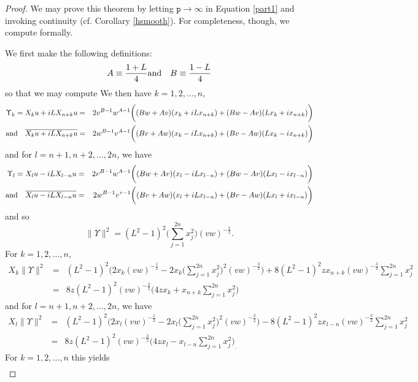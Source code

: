 \documentclass[12pt]{amsart}
\theoremstyle{plain}
\theoremstyle{definition}
\numberwithin{equation}{section}
\begin{document}
\begin{proof}
We may prove this theorem by letting ${\texttt{p}}\to\infty$ in Equation \eqref{part1} and invoking continuity (cf. Corollary \ref{hsmooth}). For completeness, though, we compute formally. 

We first make the following definitions:
\begin{eqnarray*}
A  \equiv  \frac{1+L}{4} & \textmd{and} & 
B  \equiv  \frac{1-L}{4} 
\end{eqnarray*}
so that we may compute
We then have $k=1,2,\ldots, n$, 
\begin{eqnarray*}
\Upsilon_k=X_ku+iLX_{n+k}u & = & 2v^{B-1}w^{A-1}\bigg((B w+ A v)(x_k+iLx_{n+k})+(B w- A v)(Lx_k+ix_{n+k})\bigg)\\
\textmd{and} \ \ \ \overline{X_ku+iLX_{n+k}u} & = & 2w^{B-1}v^{A-1}\bigg((B v+ A w)(x_k-iLx_{n+k}) +(B v- A w)(Lx_k-ix_{n+k})\bigg)
\end{eqnarray*}
and for $l=n+1, n+2, \ldots, 2n$, we have
\begin{eqnarray*}
\Upsilon_l=X_lu-iLX_{l-n}u & = & 2v^{B-1}w^{A-1}\bigg((B w+ A v)(x_l-iLx_{l-n})+(B w- A v)(Lx_{l}-ix_{l-n})\bigg)\\
\textmd{and} \ \ \ \overline{X_lu-iLX_{l-n}u} & = & 2w^{B-1}v^{\tau-1}\bigg((B v+ A w)(x_l+iLx_{l-n})+(B v- A w)(Lx_{l}+ix_{l-n})\bigg)
\end{eqnarray*}
and so 
\begin{equation*}
\| \Upsilon\|^{2}
= ( L^2-1)^2\Big(\sum_{j=1}^{2n}x_j^2 \Big)(vw)^{-\frac{1}{2}}.
\end{equation*}
For $k=1,2,\ldots, n$, 
\begin{eqnarray*}
X_k\| \Upsilon\|^{2}
 & = & ( L^2-1)^2\Big(2x_k (vw)^{-\frac{1}{2}}-2x_k\Big(\sum_{j=1}^{2n}x_j^2\Big)^2 (vw)^{-\frac{3}{2}} \Big)+8( L^2-1)^2zx_{n+k}(vw)^{-\frac{3}{2}}\sum_{j=1}^{2n}x_j^2 \\
  & = & 8z( L^2-1)^2(vw)^{-\frac{3}{2}} \Big (4z x_k +x_{n+k}\sum_{j=1}^{2n}x_j^2\Big) 
 \end{eqnarray*}
and for $l=n+1, n+2, \ldots, 2n$, we have
\begin{eqnarray*}
X_l\| \Upsilon\|^{2}
 & = & ( L^2-1)^2 \Big(2x_l (vw)^{-\frac{1}{2}}-2x_l\Big(\sum_{j=1}^{2n}x_j^2\Big)^2 (vw)^{-\frac{3}{2}} \Big)-8( L^2-1)^2zx_{l-n}(vw)^{-\frac{3}{2}}\sum_{j=1}^{2n}x_j^2 \\
  & = & 8z( L^2-1)^2(vw)^{-\frac{3}{2}}  \Big(4z x_l -x_{l-n}\sum_{j=1}^{2n}x_j^2\Big)_. 
 \end{eqnarray*}
For $k=1,2,\ldots, n$ this yields
\begin{eqnarray}

\end{eqnarray}
\end{proof}
\end{document}
